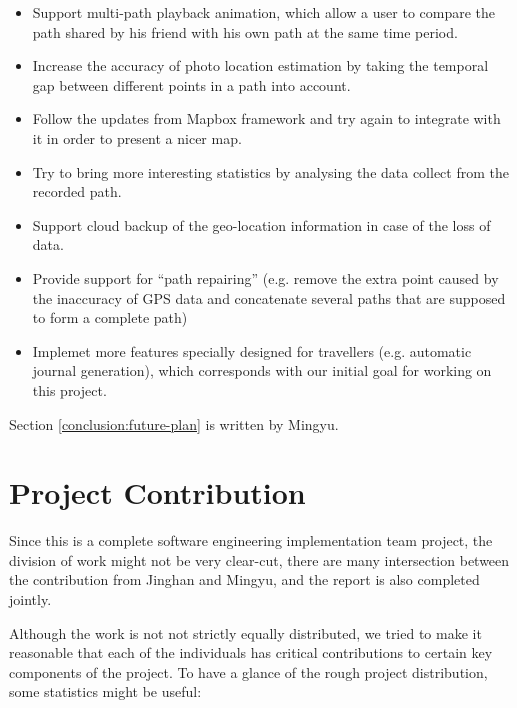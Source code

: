 \documentclass[12pt,a4paper]{article}
\begin{document}
            \begin{itemize}
                \setlength\itemsep{-0.5em}
                \item Support multi-path playback animation, which allow a user to compare the path shared by his friend with his own path at the same time period.
                \item Increase the accuracy of photo location estimation by taking the temporal gap between different points in a path into account.
                \item Follow the updates from Mapbox framework and try again to integrate with it in order to present a nicer map.
                \item Try to bring more interesting statistics by analysing the data collect from the recorded path.
                \item Support cloud backup of the geo-location information in case of the loss of data.
                \item Provide support for ``path repairing'' (e.g. remove the extra point caused by the inaccuracy of GPS data and concatenate several paths that are supposed to form a complete path)
                \item Implemet more features specially designed for travellers (e.g. automatic journal generation), which corresponds with our initial goal for working on this project.
            \end{itemize}
                
            \footnotesize
                Section \ref{conclusion:future-plan} is written by Mingyu.
            \normalsize
    \clearpage
    
    
    \setcounter{page}{7} %
    
    \section*{Project Contribution}
    
    Since this is a complete software engineering implementation team project, the division of work might not be very clear-cut, there are many intersection between the contribution from Jinghan and Mingyu, and the report is also completed jointly.
    
    Although the work is not not strictly equally distributed, we tried to make it reasonable that each of the individuals has critical contributions to certain key components of the project. To have a glance of the rough project distribution, some statistics might be useful:
    
\end{document}
